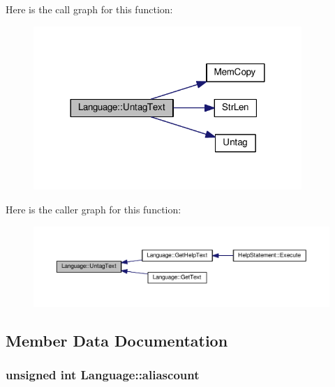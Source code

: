Here is the call graph for this function\+:\nopagebreak
\begin{figure}[H]
\begin{center}
\leavevmode
\includegraphics[width=288pt]{classLanguage_a69c5b3269ec8570a2f8f28e8e632cf44_cgraph}
\end{center}
\end{figure}




Here is the caller graph for this function\+:\nopagebreak
\begin{figure}[H]
\begin{center}
\leavevmode
\includegraphics[width=350pt]{classLanguage_a69c5b3269ec8570a2f8f28e8e632cf44_icgraph}
\end{center}
\end{figure}




\subsection{Member Data Documentation}
\subsubsection[{\texorpdfstring{aliascount}{aliascount}}]{\setlength{\rightskip}{0pt plus 5cm}unsigned int Language\+::aliascount\hspace{0.3cm}{\ttfamily [protected]}}\hypertarget{classLanguage_ac7bd12392a659fa797e123a0d84414e5}{}\label{classLanguage_ac7bd12392a659fa797e123a0d84414e5}


